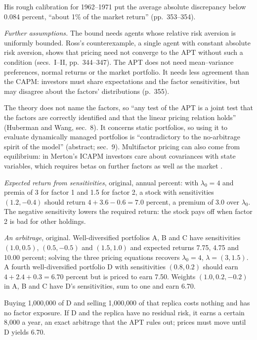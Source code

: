 \begin{qfmodel}
His rough calibration for 1962--1971 put the average absolute discrepancy below 0.084 percent, ``about 1\% of the market return'' (pp.~353--354).

\emph{Further assumptions.} The bound needs agents whose relative risk aversion is uniformly bounded. Ross's counterexample, a single agent with constant absolute risk aversion, shows that pricing need not converge to the APT without such a condition (secs.~I--II, pp.~344--347). The APT does not need mean--variance preferences, normal returns or the market portfolio. It needs less agreement than the CAPM: investors must share expectations and the factor sensitivities, but may disagree about the factors' distributions (p.~355).

The theory does not name the factors, so ``any test of the APT is a joint test that the factors are correctly identified and that the linear pricing relation holds'' (Huberman and Wang, sec.~8). It concerns static portfolios, so using it to evaluate dynamically managed portfolios is ``contradictory to the no-arbitrage spirit of the model'' (abstract; sec.~9). Multifactor pricing can also come from equilibrium: in Merton's ICAPM investors care about covariances with state variables, which requires betas on further factors as well as the market \citep[\emph{JEP} 18(3), 2004, pp.~37--38]{capm-theory-evidence-2004}.

 \emph{Expected return from sensitivities}, original, annual percent: with $\lambda_0=4$ and premia of 3 for factor 1 and 1.5 for factor 2, a stock with sensitivities $(1.2,-0.4)$ should return $4+3.6-0.6=7.0$ percent, a premium of 3.0 over $\lambda_0$. The negative sensitivity lowers the required return: the stock pays off when factor 2 is bad for other holdings.

\emph{An arbitrage}, original. Well-diversified portfolios A, B and C have sensitivities $(1.0,0.5)$, $(0.5,-0.5)$ and $(1.5,1.0)$ and expected returns 7.75, 4.75 and 10.00 percent; solving the three pricing equations recovers $\lambda_0=4$, $\lambda=(3,1.5)$. A fourth well-diversified portfolio D with sensitivities $(0.8,0.2)$ should earn $4+2.4+0.3=6.70$ percent but is priced to earn 7.50. Weights $(1.0,0.2,-0.2)$ in A, B and C have D's sensitivities, sum to one and earn 6.70.

Buying 1{,}000{,}000 of D and selling 1{,}000{,}000 of that replica costs nothing and has no factor exposure. If D and the replica have no residual risk, it earns a certain 8{,}000 a year, an exact arbitrage that the APT rules out; prices must move until D yields 6.70.


\end{qfmodel}
